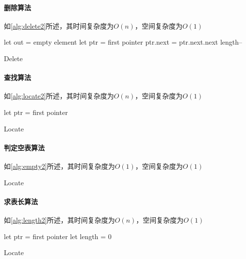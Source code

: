 \paragraph{删除算法}如\autoref{alg:delete2}所述，其时间复杂度为$O(n)$，空间复杂度为$O(1)$
\par
\begin{algorithm}[H]
    \SetAlgoLined
    let out = empty element\;
    let ptr = first pointer\;
    ptr.next = ptr.next.next\;
    length--
\caption{Delete}\label{alg:delete2}
\end{algorithm}
\paragraph{查找算法}如\autoref{alg:locate2}所述，其时间复杂度为$O(n)$，空间复杂度为$O(1)$
\par
\begin{algorithm}[H]
    \SetAlgoLined
    let ptr = first pointer\;
\caption{Locate}\label{alg:locate2}
\end{algorithm}
\paragraph{判定空表算法}如\autoref{alg:empty2}所述，其时间复杂度为$O(1)$，空间复杂度为$O(1)$
\par
\begin{algorithm}[H]
    \SetAlgoLined
    \Else{\Return{\FALSE}}
\caption{Locate}\label{alg:empty2}
\end{algorithm}
\paragraph{求表长算法}如\autoref{alg:length2}所述，其时间复杂度为$O(n)$，空间复杂度为$O(1)$
\par
\begin{algorithm}[H]
    \SetAlgoLined
    let ptr = first pointer\;
    let length = 0\;
\caption{Locate}\label{alg:length2}
\end{algorithm}
